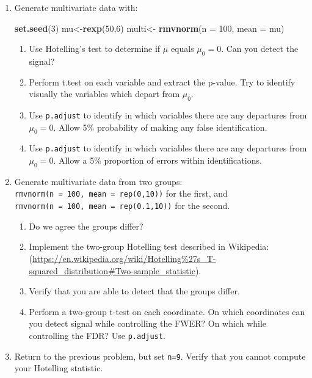 \documentclass[]{book}
\newenvironment{Shaded}{\begin{snugshade}}{\end{snugshade}}
\newcommand{\DataTypeTok}[1]{\textcolor[rgb]{0.13,0.29,0.53}{#1}}
\newcommand{\DecValTok}[1]{\textcolor[rgb]{0.00,0.00,0.81}{#1}}
\newcommand{\KeywordTok}[1]{\textcolor[rgb]{0.13,0.29,0.53}{\textbf{#1}}}
\newcommand{\NormalTok}[1]{#1}
\newcommand{\StringTok}[1]{\textcolor[rgb]{0.31,0.60,0.02}{#1}}
\providecommand{\tightlist}{%
  \setlength{\itemsep}{0pt}\setlength{\parskip}{0pt}}
\theoremstyle{definition}
\theoremstyle{definition}
\theoremstyle{definition}
\theoremstyle{remark}
\begin{document}
\begin{enumerate}
\def\labelenumi{\arabic{enumi}.}
\item
  Generate multivariate data with:

\begin{Shaded}
\begin{Highlighting}[]
\KeywordTok{set.seed}\NormalTok{(}\DecValTok{3}\NormalTok{)}
\NormalTok{mu<-}\KeywordTok{rexp}\NormalTok{(}\DecValTok{50}\NormalTok{,}\DecValTok{6}\NormalTok{)}
\NormalTok{multi<-}\StringTok{  }\KeywordTok{rmvnorm}\NormalTok{(}\DataTypeTok{n =} \DecValTok{100}\NormalTok{, }\DataTypeTok{mean =}\NormalTok{ mu) }
\end{Highlighting}
\end{Shaded}

  \begin{enumerate}
  \def\labelenumii{\alph{enumii}.}
  \tightlist
  \item
    Use Hotelling's test to determine if \(\mu\) equals \(\mu_0=0\). Can you detect the signal?
  \item
    Perform t.test on each variable and extract the p-value. Try to identify visually the variables which depart from \(\mu_0\).
  \item
    Use \texttt{p.adjust} to identify in which variables there are any departures from \(\mu_0=0\). Allow 5\% probability of making any false identification.
  \item
    Use \texttt{p.adjust} to identify in which variables there are any departures from \(\mu_0=0\). Allow a 5\% proportion of errors within identifications.
  \end{enumerate}
\item
  Generate multivariate data from two groups: \texttt{rmvnorm(n\ =\ 100,\ mean\ =\ rep(0,10))} for the first, and \texttt{rmvnorm(n\ =\ 100,\ mean\ =\ rep(0.1,10))} for the second.

  \begin{enumerate}
  \def\labelenumii{\alph{enumii}.}
  \tightlist
  \item
    Do we agree the groups differ?
  \item
    Implement the two-group Hotelling test described in Wikipedia: (\url{https://en.wikipedia.org/wiki/Hotelling\%27s_T-squared_distribution\#Two-sample_statistic}).
  \item
    Verify that you are able to detect that the groups differ.
  \item
    Perform a two-group t-test on each coordinate. On which coordinates can you detect signal while controlling the FWER? On which while controlling the FDR? Use \texttt{p.adjust}.
  \end{enumerate}
\item
  Return to the previous problem, but set \texttt{n=9}. Verify that you cannot compute your Hotelling statistic.
\end{enumerate}
\end{document}
